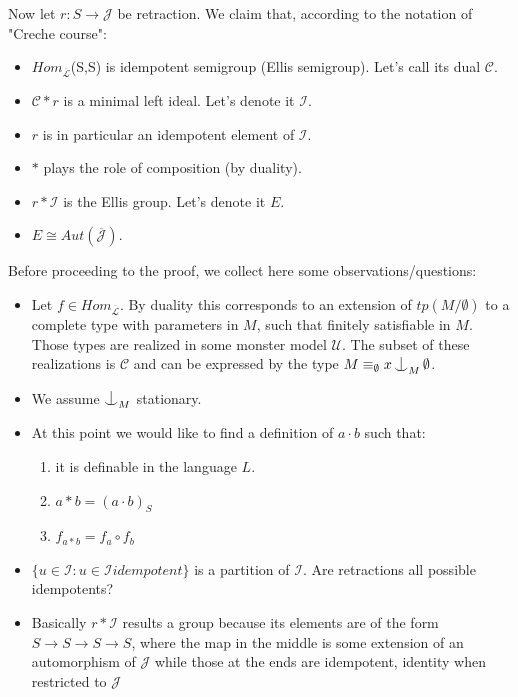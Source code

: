 \documentclass[11pt,a4paper]{article}
\theoremstyle{plain}
\theoremstyle{definition}
\def\nonfork{\mathop{\raise0.2ex\hbox{\ooalign{\hidewidth$\vert$\hidewidth\cr\raise-0.9ex\hbox{$\smile$}}}}}
\begin{document}
Now let $r: S \to \mathcal{J}$ be retraction. We claim that, according to the notation of "Creche course":
\begin{itemize}
	\item	$Hom_{\mathcal{\overline{L}}}$(S,S) is idempotent semigroup (Ellis semigroup). Let's call its dual $\mathcal{C}$.
	\item	$\mathcal{C} * r$ is a minimal left ideal. Let's denote it $\mathcal{I}$.
	\item	$r$ is in particular an idempotent element of $\mathcal{I}$.
	\item	$*$ plays the role of composition (by duality).
	\item	$r * \mathcal{I}$ is the Ellis group. Let's denote it $E$.
	\item	$E \cong Aut(\mathcal{\overline{J}})$.
\end{itemize}

Before proceeding to the proof, we collect here some observations/questions:
\begin{itemize}
	\item	Let $f \in Hom_{\mathcal{\overline{L}}}$. By duality this corresponds to an extension of $tp(M/\emptyset)$ to a complete type with parameters in $M$, such that finitely satisfiable in $M$.
		Those types are realized in some monster model $\mathcal{U}$. The subset of these realizations is $\mathcal{C}$ and can be expressed by the type $M \equiv_{\emptyset} x \nonfork_M \emptyset$.
	\item	We assume $\nonfork_M$ stationary.
	\item	At this point we would like to find a definition of $a \cdot b$ such that:
		\begin{enumerate}
			\item	it is definable in the language $L$.	
			\item	$a * b = (a \cdot b)_S$
			\item	$f_{a * b} = f_a \circ f_b$
		\end{enumerate}
	\item	$\{u \in \mathcal{I} : u \in \mathcal{I} idempotent\}$ is a partition of $\mathcal{I}$. Are retractions all possible idempotents?
	\item	Basically $r * \mathcal{I}$ results a group because its elements are of the form $S \to S \to S \to S$, 
		where the map in the middle is some extension of an automorphism of $\mathcal{J}$ while those at the ends are idempotent, identity when restricted to $\mathcal{J}$
\end{itemize}
\end{document}

